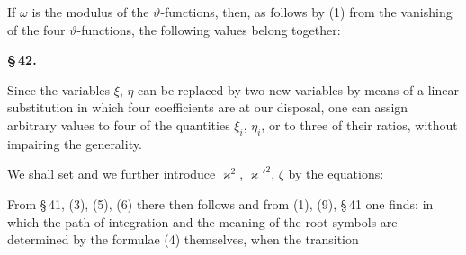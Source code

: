 
If \(\omega\) is the modulus of the \(\vartheta\)-functions, then, as follows by
(1) from the vanishing of the four \(\vartheta\)-functions, the following values
belong together:

\begin{center}
\textbf{\S\,42. }
\end{center}

Since the variables \(\xi\), \(\eta\) can be replaced by two new variables by
means of a linear substitution in which four coefficients are at our
disposal, one can assign arbitrary values to four of the quantities \(\xi_i\),
\(\eta_i\), or to three of their ratios, without impairing the
generality.

We shall set
and we further introduce \(\varkappa^2\), \(\varkappa'^2\), \(\zeta\) by the equations:

From \S\,41, (3), (5), (6) there then follows
and from (1), (9), \S\,41 one finds:
in which the path of integration and the meaning of the root symbols are
determined by the formulae (4) themselves, when the transition
